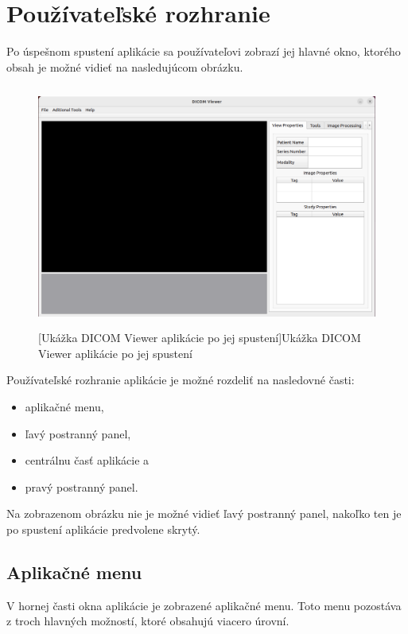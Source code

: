 {\section {Používateľské rozhranie}\label{old_ui}
Po úspešnom spustení aplikácie sa používateľovi zobrazí jej hlavné okno, ktorého obsah je možné vidieť na nasledujúcom obrázku.
\begin {figure}[ht]
        \centering
        \includegraphics[height=8cm]{media/existing_app/init.png}
        \captionsetup{justification=centering}
        [Ukážka DICOM Viewer aplikácie po jej spustení]{Ukážka DICOM Viewer aplikácie po jej spustení}
\end {figure}

Používateľské rozhranie aplikácie je možné rozdeliť na nasledovné časti:
\begin {itemize}
\item {aplikačné menu,}
\item {ľavý postranný panel,}
\item {centrálnu časť aplikácie a}
\item {pravý postranný panel.}
\end {itemize}

Na zobrazenom obrázku nie je možné vidieť ľavý postranný panel, nakoľko ten je po spustení aplikácie predvolene skrytý.\clearpage

\subsection {Aplikačné menu}
V hornej časti okna aplikácie je zobrazené aplikačné menu. Toto menu pozostáva z troch hlavných možností, ktoré obsahujú viacero úrovní.

}
